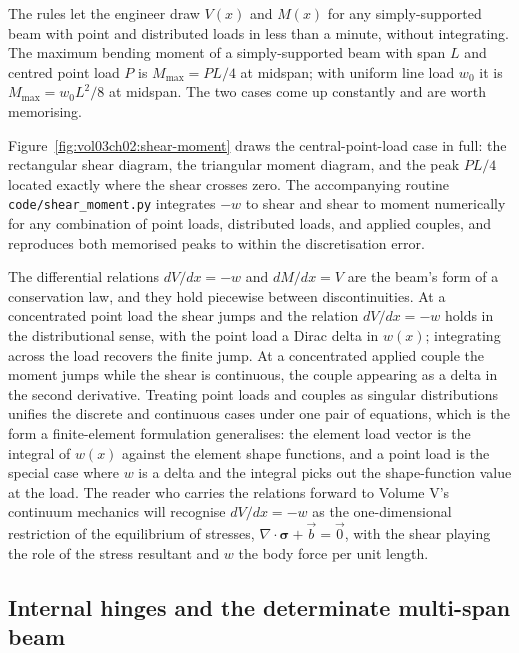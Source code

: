 The rules let the engineer draw $V(x)$ and $M(x)$ for any
simply-supported beam with point and distributed loads in less
than a minute, without integrating. The maximum bending moment of a
simply-supported beam with span $L$ and centred point load $P$ is
$M_{\max} = PL/4$ at midspan; with uniform line load $w_0$ it is
$M_{\max} = w_0 L^2 / 8$ at midspan. The two cases come up
constantly and are worth memorising.



Figure~\ref{fig:vol03ch02:shear-moment} draws the central-point-load
case in full: the rectangular shear diagram, the triangular moment
diagram, and the peak $PL/4$ located exactly where the shear crosses
zero. The accompanying routine
\texttt{code/shear\_moment.py} integrates $-w$ to shear and shear to
moment numerically for any combination of point loads, distributed
loads, and applied couples, and reproduces both memorised peaks to
within the discretisation error.

\begin{mastery}
The differential relations $dV/dx = -w$ and $dM/dx = V$ are the beam's
form of a conservation law, and they hold piecewise between
discontinuities. At a concentrated point load the shear jumps and the
relation $dV/dx = -w$ holds in the distributional sense, with the point
load a Dirac delta in $w(x)$; integrating across the load recovers the
finite jump. At a concentrated applied couple the moment jumps while the
shear is continuous, the couple appearing as a delta in the second
derivative. Treating point loads and couples as singular distributions
unifies the discrete and continuous cases under one pair of equations,
which is the form a finite-element formulation generalises: the element
load vector is the integral of $w(x)$ against the element shape
functions, and a point load is the special case where $w$ is a delta and
the integral picks out the shape-function value at the load. The reader
who carries the relations forward to Volume V's continuum mechanics will
recognise $dV/dx = -w$ as the one-dimensional restriction of the
equilibrium of stresses, $\nabla \cdot \boldsymbol{\sigma} +
\vec{b} = \vec{0}$, with the shear playing the role of the stress
resultant and $w$ the body force per unit length.
\end{mastery}

\subsection{Internal hinges and the determinate multi-span beam}

